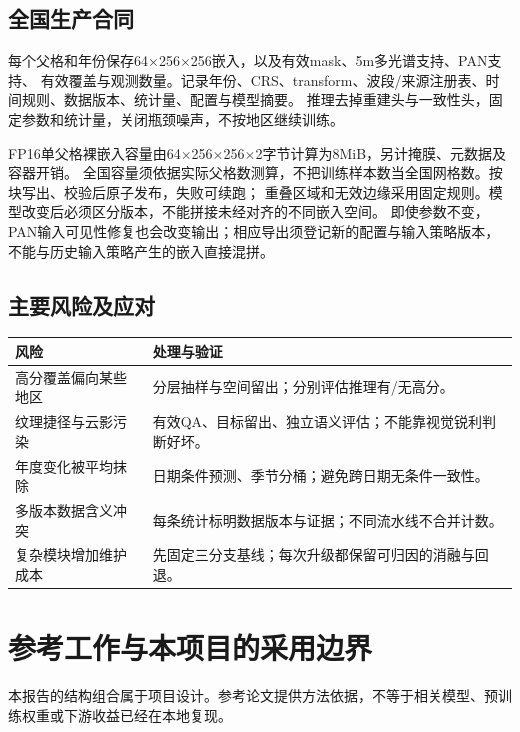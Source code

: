 \documentclass[UTF8,fontset=fandol,zihao=5,a4paper]{ctexart}
\newcommand{\reportpage}{\clearpage}
\begin{document}
\subsection{全国生产合同}
每个父格和年份保存64$\times$256$\times$256嵌入，以及有效mask、5m多光谱支持、PAN支持、
有效覆盖与观测数量。记录年份、CRS、transform、波段/来源注册表、时间规则、数据版本、统计量、配置与模型摘要。
推理去掉重建头与一致性头，固定参数和统计量，关闭瓶颈噪声，不按地区继续训练。

FP16单父格裸嵌入容量由64$\times$256$\times$256$\times$2字节计算为8MiB，另计掩膜、元数据及容器开销。
全国容量须依据实际父格数测算，不把训练样本数当全国网格数。按块写出、校验后原子发布，失败可续跑；
重叠区域和无效边缘采用固定规则。模型改变后必须区分版本，不能拼接未经对齐的不同嵌入空间。
即使参数不变，PAN输入可见性修复也会改变输出；相应导出须登记新的配置与输入策略版本，
不能与历史输入策略产生的嵌入直接混拼。

\subsection{主要风险及应对}
\noindent\begin{tabularx}{\linewidth}{@{}p{3cm}Y@{}}
\toprule 风险 & 处理与验证\\\midrule
高分覆盖偏向某些地区 & 分层抽样与空间留出；分别评估推理有/无高分。\\
纹理捷径与云影污染 & 有效QA、目标留出、独立语义评估；不能靠视觉锐利判断好坏。\\
年度变化被平均抹除 & 日期条件预测、季节分桶；避免跨日期无条件一致性。\\
多版本数据含义冲突 & 每条统计标明数据版本与证据；不同流水线不合并计数。\\
复杂模块增加维护成本 & 先固定三分支基线；每次升级都保留可归因的消融与回退。\\\bottomrule
\end{tabularx}

\reportpage
\section{参考工作与本项目的采用边界}
本报告的结构组合属于项目设计。参考论文提供方法依据，不等于相关模型、预训练权重或下游收益已经在本地复现。
\end{document}
